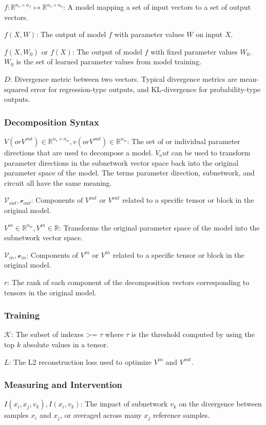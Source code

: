 \documentclass{article}
\theoremstyle{plain}
\theoremstyle{definition}
\theoremstyle{remark}
\begin{document}
$f: \mathbb{R}^{n_s \times n_f} \mapsto \mathbb{R}^{n_s \times n_o}$: A model mapping a set of input vectors to a set of output vectors.

$f(X, W)$: The output of model $f$ with parameter values $W$ on input $X$.

$f(X, W_0)$ or $f(X)$: The output of model $f$ with fixed parameter values $W_0 $. $W_0$ is the set of learned parameter values from model training.

$D$: Divergence metric between two vectors. Typical divergence metrics are mean-squared error for regression-type outputs, and KL-divergence for probability-type outputs. 

\subsubsection{Decomposition Syntax}
$V (or V^{out}) \in \mathbb{R}^{n_v \times n_w}, v (or V^{out})  \in \mathbb{R}^{n_w}$: The set of or individual parameter directions that are used to decompose a model. $V_out$ can be used to transform parameter directions in the subnetwork vector space back into the original parameter space of the model. The terms parameter direction, subnetwork, and circuit all have the same meaning. 

$\mathcal{V}_{out}, \mathcal{v}_{out}$: Components of $V^{out}$ or $V^{out}$ related to a specific tensor or block in the original model. 

$V^{in} \in \mathbb{R}^{n_w}, V^{in} \in \mathbb{R}$: Transforms the original parameter space of the model into the subnetwork vector space. 

$\mathcal{V}_{in}, \mathcal{v}_{in}$: Components of $V^{in}$ or $V^{in}$ related to a specific tensor or block in the original model. 

$r$: The rank of each component of the decomposition vectors corresponding to tensors in the original model. 

\subsubsection{Training}

$\mathcal{K}$: The subset of indexes >= $\tau$ where $\tau$ is the threshold computed by using the top $k$ absolute values in a tensor. 

$L$: The L2 reconstruction loss used to optimize $V^{in}$ and $V^{out}$.

\subsubsection{Measuring and Intervention}
$I(x_i, x_j, v_k), I(x_i, v_k)$: The impact of subnetwork $v_k$ on the divergence between samples $x_i$ and $x_j$, or averaged across many $x_j$ reference samples.
\end{document}
